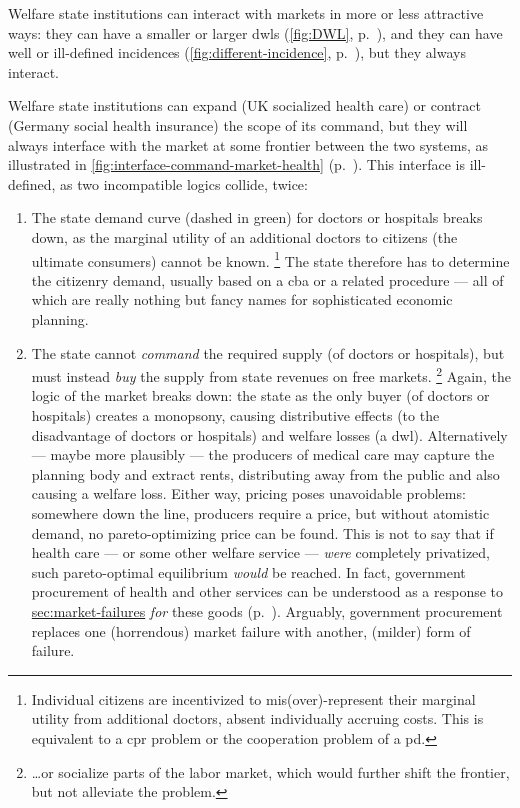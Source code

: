 Welfare state institutions can interact with markets in more or less attractive ways:
they can have a smaller or larger \glspl{dwl} (\autoref{fig:DWL}, p.~\pageref{fig:DWL}), and they can have well or ill-defined incidences (\autoref{fig:different-incidence}, p.~\pageref{fig:different-incidence}), but they always interact.%

Welfare state institutions can expand (UK socialized health care) or contract (Germany social health insurance) the scope of its command, but they will always interface with the market at some frontier between the two systems, as illustrated in \autoref{fig:interface-command-market-health} (p.~\pageref{fig:interface-command-market-health}).
This interface is ill-defined, as two incompatible logics collide, twice:

\begin{enumerate}
	\item The state demand curve (dashed in green) for doctors or hospitals breaks down, as the marginal utility of an additional doctors to citizens (the ultimate consumers) cannot be known.
	\footnote{
		Individual citizens are incentivized to mis(over)-represent their marginal utility from additional doctors, absent individually accruing costs.
		This is equivalent to a \gls{cpr} problem or the cooperation problem of a \gls{pd}.
	}
	The state therefore has to determine the citizenry demand, usually based on a \gls{cba} or a related procedure --- all of which are really nothing but fancy names for sophisticated economic planning.

	\item The state cannot \emph{command} the required supply (of doctors or hospitals), but must instead \emph{buy} the supply from state revenues on free markets.
	\footnote{
		\ldots or socialize parts of the labor market, which would further shift the frontier, but not alleviate the problem.
	}
	Again, the logic of the market breaks down:
	the state as the only buyer (of doctors or hospitals) creates a monopsony, causing distributive effects (to the disadvantage of doctors or hospitals) and welfare losses (a \gls{dwl}).
	Alternatively --- maybe more plausibly --- the producers of medical care may capture the planning body and extract rents, distributing away from the public and also causing a welfare loss.
	Either way, pricing poses unavoidable problems:
	somewhere down the line, producers require a price, but without atomistic demand, no pareto-optimizing price can be found.
	This is not to say that if health care --- or some other welfare service --- \emph{were} completely privatized, such pareto-optimal equilibrium \emph{would} be reached.
	In fact, government procurement of health and other services can be understood as a response to \hyperref[failed atomistic markets]{sec:market-failures} \emph{for} these goods (p.~\pageref{sec:market-failures}).
	Arguably, government procurement replaces one (horrendous) market failure with another, (milder) form of failure.
\end{enumerate}

